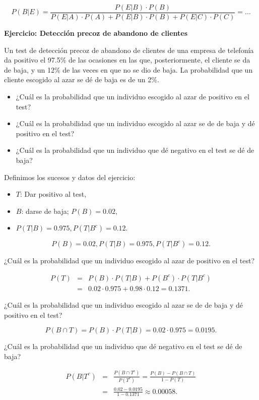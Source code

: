 \documentclass[]{book}
\providecommand{\tightlist}{%
  \setlength{\itemsep}{0pt}\setlength{\parskip}{0pt}}
\begin{document}
\[P(B|E)\!=\!\dfrac{P(E|B)\cdot P(B)}{P(E|A)\!\cdot\! P(A)\!+\!P(E|B)\!\cdot\! P(B)\!+\!P(E|C)\!\cdot\! P(C)}\!=\!\ldots\]

\textbf{Ejercicio: Detección precoz de abandono de clientes}

Un test de detección precoz de abandono de clientes de una empresa de telefonía da positivo el 97.5\% de las ocasiones en las que, posteriormente, el cliente se da de baja, y un 12\% de las veces en que no se dio de baja. La probabilidad que un cliente escogido al azar se dé de baja es de un 2\%.

\begin{itemize}
\tightlist
\item
  ¿Cuál es la probabilidad que un individuo escogido al azar de positivo en el test?
\item
  ¿Cuál es la probabilidad que un individuo escogido al azar se de de baja y dé positivo en el test?
\item
  ¿Cuál es la probabilidad que un individuo que dé negativo en el test se dé de baja?
\end{itemize}

Definimos los sucesos y datos del ejercicio:

\begin{itemize}
\tightlist
\item
  \(T\): Dar positivo al test,
\item
  \(B\): darse de baja; \(P(B)=0.02\),
\item
  \(P(T|B)=0.975, P(T|B^c)=0.12\).
\end{itemize}

\[P(B)=0.02, P(T|B)=0.975, P(T|B^c)=0.12.\]

¿Cuál es la probabilidad que un individuo escogido al azar de positivo en el test?

\begin{eqnarray*}
P(T) &= & P(B)\cdot P(T|B)+P(B^c)\cdot P(T|B^c)\\
& = &0.02\cdot 0.975+0.98\cdot 0.12=0.1371.
\end{eqnarray*}

¿Cuál es la probabilidad que un individuo escogido al azar se de de baja y dé positivo en el test?

\[P(B\cap T)= P(B)\cdot P(T|B)=0.02\cdot 0.975=0.0195.\]

¿Cuál es la probabilidad que un individuo que dé negativo en el test se dé de baja?

\begin{eqnarray*}
P(B|T^c) & = &\displaystyle \frac{P(B\cap T^c)}{P(T^c)}=
\frac{P(B)-P(B\cap T)}{1-P(T)}\\
& = & \displaystyle
\frac{0.02-0.0195}{1-0.1371}\approx 0.00058.
\end{eqnarray*}
\end{document}
